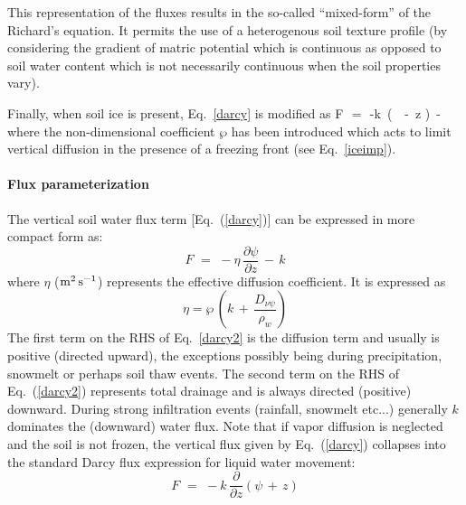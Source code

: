 This representation of the fluxes results in the so-called
``mixed-form'' of the Richard's equation. It permits the
use of a heterogenous soil texture profile (by considering
the gradient of matric potential which is continuous as opposed to soil
water content which is not necessarily continuous when the soil
properties vary).

Finally, when soil ice is present, Eq.~\ref{darcy} is modified
as
%
\beq\label{darcy_frz}
F \,\,=\,\, -k\, \left(
\wp \,  
\,-\, z \right) 
\,-\, 
\eeq
%
where the non-dimensional coefficient $\wp$ has been introduced 
which acts to limit
vertical diffusion in the presence of a freezing front
(see Eq.~\ref{iceimp}).

\paragraph{Flux parameterization}
%
The vertical soil water flux term [Eq.~(\ref{darcy})] 
can be expressed in more compact form as:
%
\begin{equation}\label{darcy2}
F \,\,=\,\, -\eta \, \frac{\partial \psi}{\partial z} \,-\, k
\end{equation}
%
where $\eta$ (${\rm m^2\,s^{-1}}$)
represents the effective diffusion coefficient.
It is expressed as
%
\begin{equation}
\eta = \wp \, \left(k \,+\, \frac{D_{\nu\psi}}{\rho_w}\right) 
\end{equation}
%
The first term on the RHS of
Eq.~\ref{darcy2} is the diffusion term and usually
is positive (directed upward), the exceptions possibly being
during precipitation, snowmelt or perhaps soil thaw events.
The second term on the RHS of Eq.~(\ref{darcy2}) 
represents total drainage and is always directed (positive) downward.
During strong infiltration events (rainfall, snowmelt etc...)
generally $k$ dominates the (downward) water flux.
%
Note that if vapor diffusion is neglected and the soil is not frozen,
the vertical flux
given by Eq.~(\ref{darcy})
collapses into the standard Darcy flux expression
for liquid water movement:
%
\begin{equation}
\label{darcy3}
F \,\,=\,\, -k\, \frac{\partial }{\partial z} 
\left( \psi \,+\, z \right) 
\end{equation}
%

